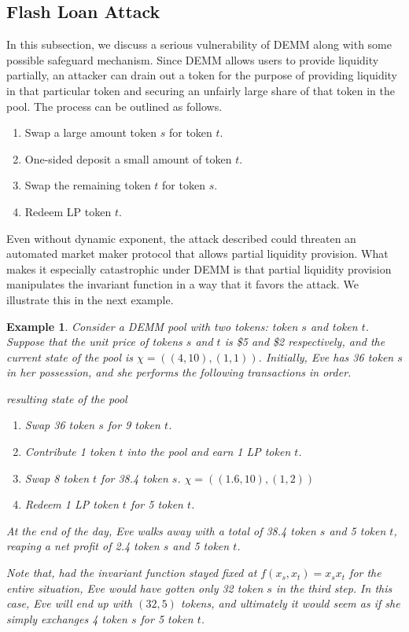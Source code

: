 \documentclass[12pt,a4paper]{article}
\newtheorem{example}[corollary]{Example}
\begin{document}
\subsection{Flash Loan Attack}

In this subsection, we discuss a serious vulnerability of DEMM along with some possible safeguard mechanism. Since DEMM allows users to provide liquidity partially, an attacker can drain out a token for the purpose of providing liquidity in that particular token and securing an unfairly large share of that token in the pool. The process can be outlined as follows.
\begin{enumerate}
\item Swap a large amount token $s$ for token $t$.
\item One-sided deposit a small amount of token $t$.
\item Swap the remaining token $t$ for token $s$.
\item Redeem LP token $t$.
\end{enumerate}
Even without dynamic exponent, the attack described could threaten an automated market maker protocol that allows partial liquidity provision. What makes it especially catastrophic under DEMM is that partial liquidity provision manipulates the invariant function in a way that it favors the attack. We illustrate this in the next example.

\begin{example}\label{ex:attack}
Consider a DEMM pool with two tokens: token $s$ and token $t$. Suppose that the unit price of tokens $s$ and $t$ is \$5 and \$2 respectively, and the current state of the pool is $\chi=((4,10),(1,1))$. Initially, Eve has 36 token $s$ in her possession, and she performs the following transactions in order.
\begin{flushright}
\hfill resulting state of the pool
\end{flushright}
\begin{enumerate}
\item Swap 36 token $s$ for 9 token $t$. \hfill {}
\item Contribute 1 token $t$ into the pool and earn 1 LP token $t$. \hfill {}
\item Swap 8 token $t$ for 38.4 token $s$. \hfill $\chi=((1.6,10),(1,2))$
\item Redeem 1 LP token $t$ for 5 token $t$. \hfill {}
\end{enumerate}
At the end of the day, Eve walks away with a total of 38.4 token $s$ and 5 token $t$, reaping a net profit of 2.4 token $s$ and 5 token $t$.

Note that, had the invariant function stayed fixed at $f(x_s,x_t)=x_sx_t$ for the entire situation, Eve would have gotten only 32 token $s$ in the third step. In this case, Eve will end up with $(32,5)$ tokens, and ultimately it would seem as if she simply exchanges 4 token $s$ for 5 token $t$.
\end{example}
\end{document}
